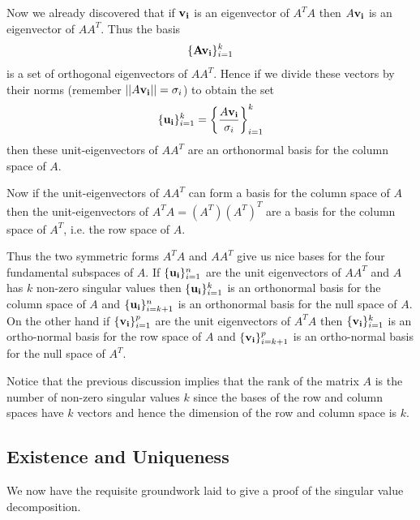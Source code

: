 \documentclass{book}
\begin{document}
{Now we already discovered that if ${\bf v_i}$ is an eigenvector of $A^TA$ then $A{\bf v_i}$ is an eigenvector of $AA^T$. Thus the basis
$$
\{{\bf Av_i}\}_{i=1}^{k}
$$
is a set of orthogonal eigenvectors of $AA^T$. Hence if we divide these vectors by their norms (remember $||A{\bf v_i}||=\sigma_i$) to obtain the set 
$$\{{\bf u_i}\}_{i=1}^{k}=\left\{\frac{A{\bf v_i}}{\sigma_i}\right\}_{i=1}^{k}$$
 then these unit-eigenvectors of $AA^T$ are an orthonormal basis for the column space of $A$. 
}

Now if the unit-eigenvectors of $AA^T$ can form a basis for the column space of $A$ then the unit-eigenvectors of $A^TA=(A^T)(A^T)^T$ are a basis for the column space of $A^T$, i.e. the row space of $A$. 

Thus the two symmetric forms $A^TA$ and $AA^T$ give us nice bases for the four fundamental subspaces of $A$. If $\{{\bf u_i}\}_{i=1}^{n}$ are the unit eigenvectors of $AA^T$ and $A$ has $k$ non-zero singular values then $\{{\bf u_i}\}_{i=1}^{k}$ is an orthonormal basis for the column space of $A$ and $\{{\bf u_i}\}_{i=k+1}^{n}$ is an orthonormal basis for the null space of $A$. On the other hand if $\{{\bf v_i}\}_{i=1}^{p}$ are the unit eigenvectors of $A^TA$ then $\{{\bf v_i}\}_{i=1}^{k}$ is an ortho-normal basis for the row space of $A$ and $\{{\bf v_i}\}_{i=k+1}^{p}$ is an ortho-normal basis for the null space of $A^T$. 

Notice that the previous discussion implies that the rank of the matrix $A$ is the number of non-zero singular values $k$ since the bases of the row and column spaces have $k$ vectors and hence the dimension of the row and column space is $k$. 

\subsection{Existence and Uniqueness}

We now have the requisite groundwork laid to give a proof of the singular value decomposition. 
\end{document}
